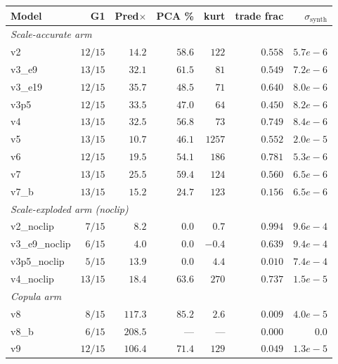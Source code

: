\documentclass[journal]{IEEEtran}
\theoremstyle{definition}   %
\begin{document}
\begin{table}[ht]
    \centering
    \footnotesize
    \begin{tabular}{lrrrrrr}
        \toprule
        Model & G1 & Pred$\times$ & PCA \% & kurt & trade frac & $\sigma_{\text{synth}}$ \\
        \midrule
        \multicolumn{7}{l}{\textit{Scale-accurate arm}} \\
        v2           & $12/15$ & $14.2$  & $58.6$ & $122$  & $0.558$ & $5.7e{-}6$ \\
        v3\_e9       & $13/15$ & $32.1$  & $61.5$ & $81$   & $0.549$ & $7.2e{-}6$ \\
        v3\_e19      & $12/15$ & $35.7$  & $48.5$ & $71$   & $0.640$ & $8.0e{-}6$ \\
        v3p5         & $12/15$ & $33.5$  & $47.0$ & $64$   & $0.450$ & $8.2e{-}6$ \\
        v4           & $13/15$ & $32.5$  & $56.8$ & $73$   & $0.749$ & $8.4e{-}6$ \\
        v5           & $13/15$ & $10.7$  & $46.1$ & $1257$ & $0.552$ & $2.0e{-}5$ \\
        v6           & $12/15$ & $19.5$  & $54.1$ & $186$  & $0.781$ & $5.3e{-}6$ \\
        v7           & $13/15$ & $25.5$  & $59.4$ & $124$  & $0.560$ & $6.5e{-}6$ \\
        v7\_b        & $13/15$ & $15.2$  & $24.7$ & $123$  & $0.156$ & $6.5e{-}6$ \\
        \midrule
        \multicolumn{7}{l}{\textit{Scale-exploded arm (noclip)}} \\
        v2\_noclip   & $7/15$  & $8.2$   & $0.0$  & $0.7$  & $0.994$ & $9.6e{-}4$ \\
        v3\_e9\_noclip & $6/15$ & $\mathbf{4.0}$ & $0.0$  & $-0.4$ & $0.639$ & $9.4e{-}4$ \\
        v3p5\_noclip & $5/15$  & $13.9$  & $0.0$  & $4.4$  & $0.010$ & $7.4e{-}4$ \\
        v4\_noclip   & $13/15$ & $18.4$  & $63.6$ & $270$  & $0.737$ & $1.5e{-}5$ \\
        \midrule
        \multicolumn{7}{l}{\textit{Copula arm}} \\
        v8           & $8/15$  & $117.3$ & $85.2$ & $2.6$  & $0.009$ & $4.0e{-}5$ \\
        v8\_b        & $6/15$  & $208.5$ & ---    & ---    & $0.000$ & $0.0$ \\
        v9           & $12/15$ & $106.4$ & $71.4$ & $129$  & $\mathbf{0.049}$ & $1.3e{-}5$ \\

\end{tabular}
\end{table}
\end{document}
